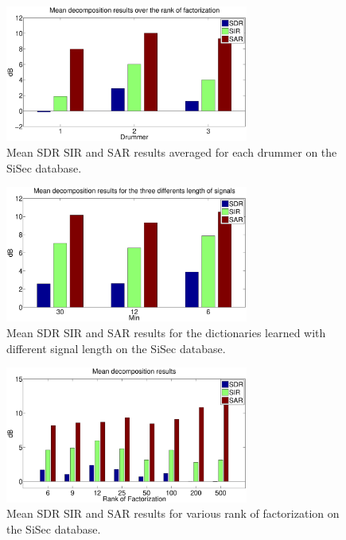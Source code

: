 \begin{figure}[t]

  \centering 
  \includegraphics[width=8cm]{fig/ResultsMeanRank}
  \caption{\label{resultsDict} Mean SDR SIR and SAR results averaged for each drummer on the SiSec database.}
  
\end{figure}

\begin{figure}[t]

  \centering 
  \includegraphics[width=8cm]{fig/ResultsMeanLength}
  \caption{\label{resultsDictLength} Mean SDR SIR and SAR results for the dictionaries learned with different signal length on the SiSec database.}
  
\end{figure}
\begin{figure}[t]

  \centering 
  \includegraphics[width=8cm]{fig/ResultsDictDrummer2}
  \caption{\label{resultsDictD2} Mean SDR SIR and SAR results for various rank of factorization on the SiSec database.}
  
\end{figure}



